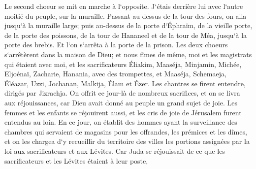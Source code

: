 \verse Le second choeur se mit en marche à l`opposite. J`étais derrière lui avec l`autre moitié du peuple, sur la muraille. Passant au-dessus de la tour des fours, on alla jusqu`à la muraille large; 
\verse puis au-dessus de la porte d`Éphraïm, de la vieille porte, de la porte des poissons, de la tour de Hananeel et de la tour de Méa, jusqu`à la porte des brebis. Et l`on s`arrêta à la porte de la prison. 
\verse Les deux choeurs s`arrêtèrent dans la maison de Dieu; et nous fîmes de même, moi et les magistrats qui étaient avec moi, 
\verse et les sacrificateurs Éliakim, Maaséja, Minjamin, Michée, Eljoénaï, Zacharie, Hanania, avec des trompettes, 
\verse et Maaséja, Schemaeja, Éléazar, Uzzi, Jochanan, Malkija, Élam et Ézer. Les chantres se firent entendre, dirigés par Jizrachja. 
\verse On offrit ce jour-là de nombreux sacrifices, et on se livra aux réjouissances, car Dieu avait donné au peuple un grand sujet de joie. Les femmes et les enfants se réjouirent aussi, et les cris de joie de Jérusalem furent entendus au loin. 
\verse En ce jour, on établit des hommes ayant la surveillance des chambres qui servaient de magasins pour les offrandes, les prémices et les dîmes, et on les chargea d`y recueillir du territoire des villes les portions assignées par la loi aux sacrificateurs et aux Lévites. Car Juda se réjouissait de ce que les sacrificateurs et les Lévites étaient à leur poste, 
